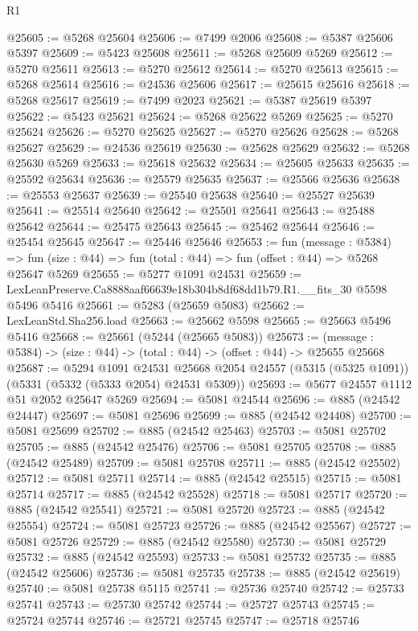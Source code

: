 \begin{lexlean}{R1}
\begin{coremodule}
@25605 := @5268 @25604
@25606 := @7499 @2006
@25608 := @5387 @25606 @5397
@25609 := @5423 @25608
@25611 := @5268 @25609 @5269
@25612 := @5270 @25611
@25613 := @5270 @25612
@25614 := @5270 @25613
@25615 := @5268 @25614
@25616 := @24536 @25606
@25617 := @25615 @25616
@25618 := @5268 @25617
@25619 := @7499 @2023
@25621 := @5387 @25619 @5397
@25622 := @5423 @25621
@25624 := @5268 @25622 @5269
@25625 := @5270 @25624
@25626 := @5270 @25625
@25627 := @5270 @25626
@25628 := @5268 @25627
@25629 := @24536 @25619
@25630 := @25628 @25629
@25632 := @5268 @25630 @5269
@25633 := @25618 @25632
@25634 := @25605 @25633
@25635 := @25592 @25634
@25636 := @25579 @25635
@25637 := @25566 @25636
@25638 := @25553 @25637
@25639 := @25540 @25638
@25640 := @25527 @25639
@25641 := @25514 @25640
@25642 := @25501 @25641
@25643 := @25488 @25642
@25644 := @25475 @25643
@25645 := @25462 @25644
@25646 := @25454 @25645
@25647 := @25446 @25646
@25653 := fun (message : @5384) =>
  fun (size : @44) => fun (total : @44) => fun (offset : @44) => @5268 @25647 @5269
@25655 := @5277 @1091 @24531
@25659 := LexLeanPreserve.Ca8888aaf66639e18b304b8df68dd1b79.R1.__fits_30 @5598 @5496 @5416
@25661 := @5283 (@25659 @5083)
@25662 := LexLeanStd.Sha256.load
@25663 := @25662 @5598
@25665 := @25663 @5496 @5416
@25668 := @25661 (@5244 (@25665 @5083))
@25673 := (message : @5384) -> (size : @44) -> (total : @44) -> (offset : @44) -> @25655 @25668
@25687 := @5294
    @1091
    @24531
    @25668
    @2054
    @24557
    (@5315 (@5325 @1091))
    (@5331 (@5332 (@5333 @2054) @24531 @5309))
@25693 := @5677 @24557 @1112 @51 @2052 @25647 @5269
@25694 := @5081 @24544
@25696 := @885 (@24542 @24447)
@25697 := @5081 @25696
@25699 := @885 (@24542 @24408)
@25700 := @5081 @25699
@25702 := @885 (@24542 @25463)
@25703 := @5081 @25702
@25705 := @885 (@24542 @25476)
@25706 := @5081 @25705
@25708 := @885 (@24542 @25489)
@25709 := @5081 @25708
@25711 := @885 (@24542 @25502)
@25712 := @5081 @25711
@25714 := @885 (@24542 @25515)
@25715 := @5081 @25714
@25717 := @885 (@24542 @25528)
@25718 := @5081 @25717
@25720 := @885 (@24542 @25541)
@25721 := @5081 @25720
@25723 := @885 (@24542 @25554)
@25724 := @5081 @25723
@25726 := @885 (@24542 @25567)
@25727 := @5081 @25726
@25729 := @885 (@24542 @25580)
@25730 := @5081 @25729
@25732 := @885 (@24542 @25593)
@25733 := @5081 @25732
@25735 := @885 (@24542 @25606)
@25736 := @5081 @25735
@25738 := @885 (@24542 @25619)
@25740 := @5081 @25738 @5115
@25741 := @25736 @25740
@25742 := @25733 @25741
@25743 := @25730 @25742
@25744 := @25727 @25743
@25745 := @25724 @25744
@25746 := @25721 @25745
@25747 := @25718 @25746

\end{coremodule}
\end{lexlean}
